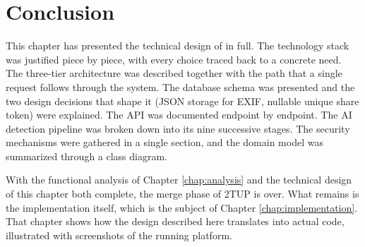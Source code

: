 \section{Conclusion}

This chapter has presented the technical design of \deepguard{} in full. The technology stack was justified piece by piece, with every choice traced back to a concrete need. The three-tier architecture was described together with the path that a single request follows through the system. The database schema was presented and the two design decisions that shape it (JSON storage for EXIF, nullable unique share token) were explained. The API was documented endpoint by endpoint. The AI detection pipeline was broken down into its nine successive stages. The security mechanisms were gathered in a single section, and the domain model was summarized through a class diagram.

With the functional analysis of Chapter \ref{chap:analysis} and the technical design of this chapter both complete, the merge phase of 2TUP is over. What remains is the implementation itself, which is the subject of Chapter \ref{chap:implementation}. That chapter shows how the design described here translates into actual code, illustrated with screenshots of the running platform.